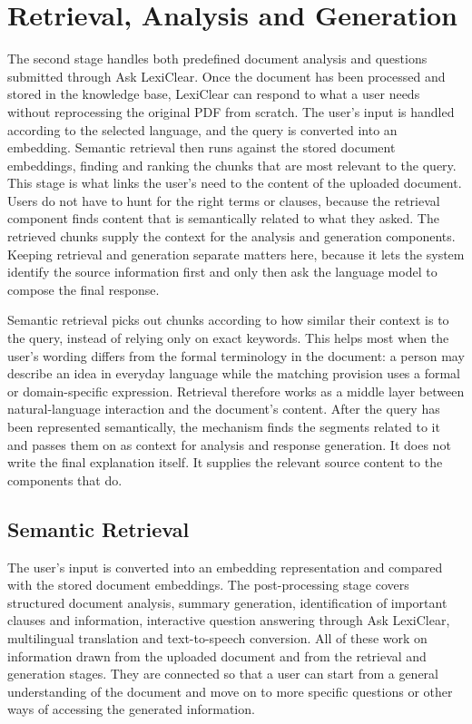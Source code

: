 \documentclass[12pt,a4paper,oneside]{report}
\begin{document}
\section{Retrieval, Analysis and Generation}

The second stage handles both predefined document analysis and questions
submitted through Ask LexiClear. Once the document has been processed and stored in the knowledge base, LexiClear can respond to what a user needs without reprocessing the original PDF from scratch. The user's input is handled according to the selected language, and the query is converted into an embedding. Semantic retrieval then runs against the stored document embeddings, finding and ranking the chunks that are most relevant to the query. This stage is what links the user's need to the content of the uploaded document. Users do not have to hunt for the right terms or clauses, because the retrieval component finds content that is semantically related to what they asked. The retrieved chunks supply the context for the analysis and generation components. Keeping retrieval and generation separate matters here, because it lets the system identify the source information first and only then ask the language model to compose the final response.

Semantic retrieval picks out chunks according to how similar their context is to the query, instead of relying only on exact keywords. This helps most when the user's wording differs from the formal terminology in the document: a person may describe an idea in everyday language while the matching provision uses a formal or domain-specific expression. Retrieval therefore works as a middle layer between natural-language interaction and the document's content. After the query has been represented semantically, the mechanism finds the segments related to it and passes them on as context for analysis and response generation. It does not write the final explanation itself. It supplies the relevant source content to the components that do.

\subsection{Semantic Retrieval}

The user's input is converted into an embedding representation and compared
with the stored document embeddings. The post-processing stage covers structured document analysis, summary generation, identification of important clauses and information, interactive question answering through Ask LexiClear, multilingual translation and text-to-speech conversion. All of these work on information drawn from the uploaded document and from the retrieval and generation stages. They are connected so that a user can start from a general understanding of the document and move on to more specific questions or other ways of accessing the generated information.
\end{document}

